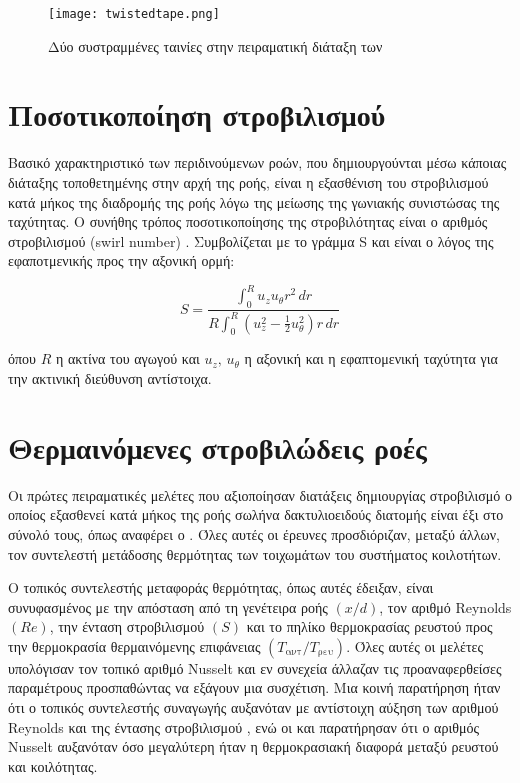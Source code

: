 \begin{figure}[htbp]
\centering
\texttt{[image: twistedtape.png]}
\caption{Δύο συστραμμένες ταινίες στην πειραματική διάταξη των \citeauthor{2016_Tamna} \cite{2016_Tamna}}\label{fig:twisttape}
\end{figure}

\section{Ποσοτικοποίηση στροβιλισμού}

\noindent Βασικό χαρακτηριστικό των περιδινούμενων ροών, που δημιουργούνται μέσω κάποιας διάταξης τοποθετημένης στην αρχή της ροής, είναι η εξασθένιση του στροβιλισμού κατά μήκος της διαδρομής της ροής λόγω της μείωσης της γωνιακής συνιστώσας της ταχύτητας. Ο συνήθης τρόπος ποσοτικοποίησης της στροβιλότητας είναι ο αριθμός στροβιλισμού (swirl number) \parencites{1984_Gupta_BOOK}{1998_FariasNeto}. Συμβολίζεται με το γράμμα S και είναι ο λόγος της εφαποτμενικής προς την αξονική ορμή:

\begin{equation}\label{eq:swirl}
S = \displaystyle\frac{\displaystyle\int_{0}^{R} u_z u_{\theta} r^2 \, dr}{R\displaystyle\int_{0}^{R} \left( u_z^2 - \frac{1}{2} u_{\theta}^2 \right)r \, dr}
\end{equation}

\noindent όπου $R$ η ακτίνα του αγωγού και $u_z,\, u_{\theta}$ η αξονική και η εφαπτομενική ταχύτητα για την ακτινική διεύθυνση αντίστοιχα.

\section{Θερμαινόμενες στροβιλώδεις ροές}

\noindent Οι πρώτες πειραματικές μελέτες που αξιοποίησαν διατάξεις δημιουργίας στροβιλισμό ο οποίος εξασθενεί κατά μήκος της ροής σωλήνα δακτυλιοειδούς διατομής είναι έξι στο σύνολό τους, όπως αναφέρει ο \citeauthor{1992_Solnordal_DISSERTATION} \cite{1992_Solnordal_DISSERTATION}. Όλες αυτές οι έρευνες προσδιόριζαν, μεταξύ άλλων, τον συντελεστή μετάδοσης θερμότητας των τοιχωμάτων του συστήματος κοιλοτήτων.

O τοπικός συντελεστής μεταφοράς θερμότητας, όπως αυτές έδειξαν, είναι συνυφασμένος με την απόσταση από τη γενέτειρα ροής $\left(x/d\right)$, τον αριθμό Reynolds $\left(Re\right)$, την ένταση στροβιλισμού $\left(S\right)$ και το πηλίκο θερμοκρασίας ρευστού προς την θερμοκρασία θερμαινόμενης επιφάνειας $\left(T_{\text{αντ}}/T_{\text{ρευ}}\right)$. Όλες αυτές οι μελέτες υπολόγισαν τον τοπικό αριθμό Nusselt και εν συνεχεία άλλαζαν τις προαναφερθείσες παραμέτρους προσπαθώντας να εξάγουν μια συσχέτιση. Μια κοινή παρατήρηση ήταν ότι ο τοπικός συντελεστής συναγωγής αυξανόταν με αντίστοιχη αύξηση των αριθμού Reynolds και της έντασης στροβιλισμού \parencites{1970_Blackwelder}{1973_KlepperO._CONF}{1975_Hay}{1984_Prata}, ενώ οι \citeauthor{1973_KlepperO._CONF} \cite{1973_KlepperO._CONF} και \citeauthor{1970_Blackwelder} \cite{1970_Blackwelder} παρατήρησαν ότι ο αριθμός Nusselt αυξανόταν όσο μεγαλύτερη ήταν η θερμοκρασιακή διαφορά μεταξύ ρευστού και κοιλότητας.

